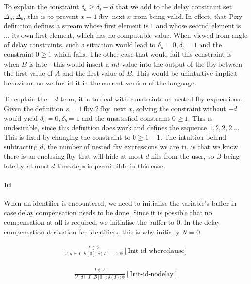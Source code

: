 \documentclass{scrartcl}
\DeclareMathOperator{\fby}{fby}
\DeclareMathOperator{\nextop}{next}
\DeclareMathOperator{\initrel}{\overset{init}{\Rightarrow}}
\begin{document}
    To explain the constraint $\delta_a \geq \delta_b - d$ that we add to the delay constraint set $\Delta_a, \Delta_b$, this is to prevent $x = 1 \fby \nextop x$ from being valid. In effect, that Pixy definition defines a stream whose first element is $1$ and whose second element is ... its own first element, which has no computable value. When viewed from angle of delay constraints, such a situation would lead to $\delta_a = 0, \delta_b = 1$ and the constraint $0 \geq 1$ which fails. The other case that would fail this constraint is when $B$ is late - this would insert a $nil$ value into the output of the fby between the first value of $A$ and the first value of $B$. This would be unintuitive implicit behaviour, so we forbid it in the current version of the language.
    
    To explain the $-d$ term, it is to deal with constraints on nested fby expressions. Given the definition $x = 1 \fby 2 \fby \nextop x$, solving the constraint without $-d$ would yield $\delta_a = 0, \delta_b = 1$ and the unsatisfied constraint $0 \geq 1$. This is undesirable, since this definition does work and defines the sequence $1, 2, 2, 2 ...$. This is fixed by changing the constraint to $0 \geq 1 - 1$. The intuition behind subtracting $d$, the number of nested fby expressions we are in, is that we know there is an enclosing fby that will hide at most $d$ nils from the user, so $B$ being late by at most $d$ timesteps is permissible in this case.
    
    \paragraph{Id}
    
    When an identifier is encountered, we need to initialise the variable's buffer in case delay compensation needs to be done. Since it is possible that no compensation at all is required, we initialise the buffer to 0. In the delay compensation derivation for identifiers, this is why initially $N=0$.
    
    \begin{align*}
    \frac{
        \begin{matrix}
        I \in \mathcal{V}
        \end{matrix}
    }{
        \mathcal{V}; d \vdash I \initrel \mathcal{B}[0]; \delta(I) + 1; \emptyset
    }[\text{Init-id-whereclause}]
    \end{align*}
    
    \begin{align*}
    \frac{
        \begin{matrix}
        I \notin \mathcal{V}
        \end{matrix}
    }{
        \mathcal{V}; d \vdash I \initrel \mathcal{B}[0]; \delta(I); \emptyset
    }[\text{Init-id-nodelay}]
    \end{align*}
    
\end{document}
